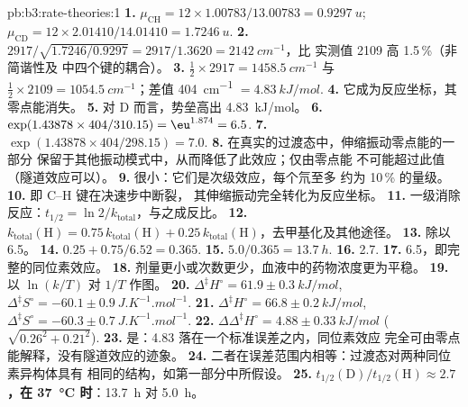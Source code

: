 \begin{solution}{pb:b3:rate-theories:1}
\textbf{1.} $\mu_{\mathrm{CH}} = 12 \times 1.00783/13.00783 = \qty{0.9297}{u}$; $\mu_{\mathrm{CD}} = 12 \times 2.01410/14.01410 =
\qty{1.7246}{u}$.
\textbf{2.} $2917/\sqrt{1.7246/0.9297} = 2917/1.3620 = \qty{2142}{cm^{-1}}$，比
实测值 2109 高 1.5\,\%（非简谐性及  中四个键的耦合）。
\textbf{3.} $\frac12 \times 2917 = \qty{1458.5}{cm^{-1}}$ 与 $\frac12 \times 2109 = \qty{1054.5}{cm^{-1}}$；差值
\qty{404}{cm^{-1}} $= \qty{4.83}{kJ/mol}$.
\textbf{4.} 它成为反应坐标，其零点能消失。
\textbf{5.} 对 D 而言，势垒高出 \qty{4.83}{kJ/mol}。
\textbf{6.} $\exp(1.43878 \times 404/310.15) = \eu^{1.874} = 6.5$.
\textbf{7.} $\exp(1.43878 \times 404/298.15) = 7.0$.
\textbf{8.} 在真实的过渡态中，伸缩振动零点能的一部分
保留于其他振动模式中，从而降低了此效应；仅由零点能
不可能超过此值（隧道效应可以）。
\textbf{9.} 很小：它们是次级效应，每个氘至多
约为 10\,\% 的量级。
\textbf{10.} 即 C--H 键在决速步中断裂，
其伸缩振动完全转化为反应坐标。
\textbf{11.} 一级消除反应：$t_{1/2} = \ln2/k_{\mathrm{total}}$，与之成反比。
\textbf{12.} $k_{\mathrm{total}}(\mathrm H) = 0.75\,k_{\mathrm{total}}(\mathrm H) + 0.25\,k_{\mathrm{total}}(\mathrm H)$，去甲基化及其他途径。
\textbf{13.} 除以 6.5。
\textbf{14.} $0.25 + 0.75/6.52 = 0.365$.
\textbf{15.} $5.0/0.365 = \qty{13.7}{h}$.
\textbf{16.} 2.7.
\textbf{17.} 6.5，即完整的同位素效应。
\textbf{18.} 剂量更小或次数更少，血液中的药物浓度更为平稳。
\textbf{19.} 以 $\ln(k/T)$ 对 $1/T$ 作图。
\textbf{20.} $\Delta^{\ddagger}H^\circ = 61.9 \pm \qty{0.3}{kJ/mol}$, $\Delta^{\ddagger}S^\circ = -60.1 \pm \qty{0.9}{J.K^{-1}.mol^{-1}}$.
\textbf{21.} $\Delta^{\ddagger}H^\circ = 66.8 \pm \qty{0.2}{kJ/mol}$, $\Delta^{\ddagger}S^\circ = -60.3 \pm \qty{0.7}{J.K^{-1}.mol^{-1}}$.
\textbf{22.} $\Delta\Delta^{\ddagger}H^\circ = 4.88 \pm \qty{0.33}{kJ/mol}$ ($\sqrt{0.26^2 + 0.21^2}$).
\textbf{23.} 是：4.83 落在一个标准误差之内，同位素效应
完全可由零点能解释，没有隧道效应的迹象。
\textbf{24.} 二者在误差范围内相等：过渡态对两种同位素异构体具有
相同的结构，如第一部分中所假设。
\textbf{25.} \textbf{$t_{1/2}(\mathrm D)/t_{1/2}(\mathrm H) \approx 2.7$，在 \qty{37}{\celsius} 时}：\qty{13.7}{h} 对 \qty{5.0}{h}。
\end{solution}
